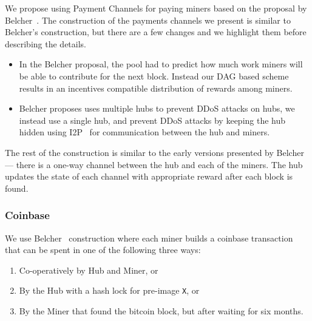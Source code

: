 \documentclass{article}
\begin{document}
We propose using Payment Channels for paying miners based on the
proposal by Belcher~\cite{channels-for-rewards}. The construction of
the payments channels we present is similar to Belcher's construction,
but there are a few changes and we highlight them before describing
the details.

\begin{itemize}
\item In the Belcher proposal, the pool had to predict how much work
  miners will be able to contribute for the next block. Instead our
  DAG based scheme results in an incentives compatible distribution of
  rewards among miners.
\item Belcher proposes uses multiple hubs to prevent DDoS attacks on
  hubs, we instead use a single hub, and prevent DDoS attacks by
  keeping the hub hidden using I2P~\cite{i2p,
    i2p-censorship-resistance} for communication between the hub and
  miners.
\end{itemize}

The rest of the construction is similar to the early versions
presented by Belcher --- there is a one-way channel between the hub
and each of the miners. The hub updates the state of each channel with
appropriate reward after each block is found.



\subsubsection{Coinbase}

We use Belcher~\cite{channels-for-rewards} construction where each
miner builds a coinbase transaction that can be spent in one of the
following three ways:

\begin{enumerate}
\item Co-operatively by Hub and Miner, or
\item By the Hub with a hash lock for pre-image \verb|X|, or
\item By the Miner that found the bitcoin block, but after waiting for
  six months.
\end{enumerate}
\end{document}
